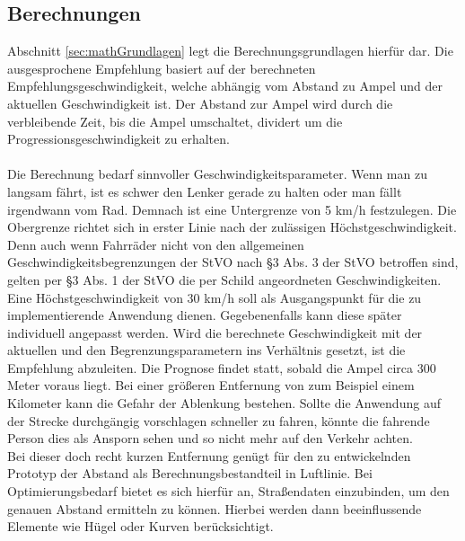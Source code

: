 \subsection{Berechnungen}
Abschnitt \ref{sec:mathGrundlagen} legt die Berechnungsgrundlagen hierfür dar. Die ausgesprochene Empfehlung basiert auf der berechneten Empfehlungsgeschwindigkeit, welche abhängig vom Abstand zu Ampel und der aktuellen Geschwindigkeit ist. Der Abstand zur Ampel wird durch die verbleibende Zeit, bis die Ampel umschaltet, dividert um die Progressionsgeschwindigkeit zu erhalten.\\\\
Die Berechnung bedarf sinnvoller Geschwindigkeitsparameter. Wenn man zu langsam fährt, ist es schwer den Lenker gerade zu halten oder man fällt irgendwann vom Rad. Demnach ist eine Untergrenze von 5 km/h festzulegen. Die Obergrenze richtet sich in erster Linie nach der zulässigen Höchstgeschwindigkeit. Denn auch wenn Fahrräder nicht von den allgemeinen Geschwindigkeitsbegrenzungen der StVO nach \S 3 Abs. 3 der StVO betroffen sind, gelten per \S 3 Abs. 1 der StVO die per Schild angeordneten Geschwindigkeiten. Eine Höchstgeschwindigkeit von 30 km/h soll als Ausgangspunkt für die zu implementierende Anwendung dienen. Gegebenenfalls kann diese später individuell angepasst werden. Wird die berechnete Geschwindigkeit mit der aktuellen und den Begrenzungsparametern ins Verhältnis gesetzt, ist die Empfehlung abzuleiten. Die Prognose findet statt, sobald die Ampel circa 300 Meter voraus liegt. Bei einer größeren Entfernung von zum Beispiel einem Kilometer kann die Gefahr der Ablenkung bestehen. Sollte die Anwendung auf der Strecke durchgängig vorschlagen schneller zu fahren, könnte die fahrende Person dies als Ansporn sehen und so nicht mehr auf den Verkehr achten.\\ 
Bei dieser doch recht kurzen Entfernung genügt für den zu entwickelnden Prototyp der Abstand als Berechnungsbestandteil in Luftlinie. Bei Optimierungsbedarf bietet es sich hierfür an, Straßendaten einzubinden, um den genauen Abstand ermitteln zu können. Hierbei werden dann beeinflussende Elemente wie Hügel oder Kurven berücksichtigt.
